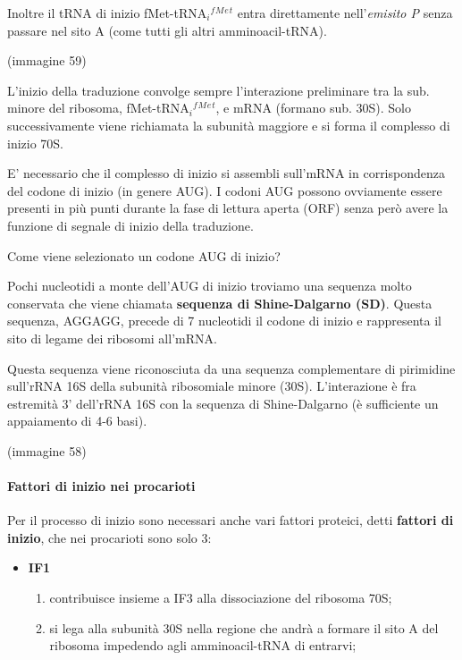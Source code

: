 \documentclass[]{article}
\begin{document}
Inoltre il tRNA di inizio fMet-tRNA\(_i\)\(^f\)\(^M\)\(^e\)\(^t\) entra
direttamente nell'\emph{emisito P} senza passare nel sito A (come tutti
gli altri amminoacil-tRNA).

(immagine 59)

L'inizio della traduzione convolge sempre l'interazione preliminare tra
la sub. minore del ribosoma, fMet-tRNA\(_i\)\(^f\)\(^M\)\(^e\)\(^t\), e
mRNA (formano sub. 30S). Solo successivamente viene richiamata la
subunità maggiore e si forma il complesso di inizio 70S.

E' necessario che il complesso di inizio si assembli sull'mRNA in
corrispondenza del codone di inizio (in genere AUG). I codoni AUG
possono ovviamente essere presenti in più punti durante la fase di
lettura aperta (ORF) senza però avere la funzione di segnale di inizio
della traduzione.

Come viene selezionato un codone AUG di inizio?

Pochi nucleotidi a monte dell'AUG di inizio troviamo una sequenza molto
conservata che viene chiamata \textbf{sequenza di Shine-Dalgarno (SD)}.
Questa sequenza, AGGAGG, precede di 7 nucleotidi il codone di inizio e
rappresenta il sito di legame dei ribosomi all'mRNA.

Questa sequenza viene riconosciuta da una sequenza complementare di
pirimidine sull'rRNA 16S della subunità ribosomiale minore (30S).
L'interazione è fra estremità 3' dell'rRNA 16S con la sequenza di
Shine-Dalgarno (è sufficiente un appaiamento di 4-6 basi).

(immagine 58)

\paragraph{Fattori di inizio nei
procarioti}\label{fattori-di-inizio-nei-procarioti}

Per il processo di inizio sono necessari anche vari fattori proteici,
detti \textbf{fattori di inizio}, che nei procarioti sono solo 3:

\begin{itemize}
\itemsep1pt\parskip0pt
\item
  \textbf{IF1}

  \begin{enumerate}
  \def\labelenumi{\arabic{enumi}.}
  \itemsep1pt\parskip0pt
  \item
    contribuisce insieme a IF3 alla dissociazione del ribosoma 70S;
  \item
    si lega alla subunità 30S nella regione che andrà a formare il sito
    A del ribosoma impedendo agli amminoacil-tRNA di entrarvi;
  \end{enumerate}
\end{itemize}
\end{document}
